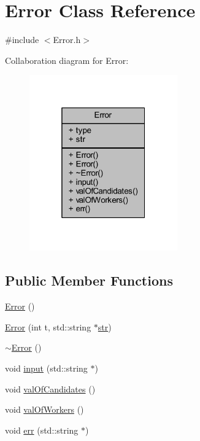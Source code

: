 \hypertarget{class_error}{}\section{Error Class Reference}
\label{class_error}


{\ttfamily \#include $<$Error.\+h$>$}



Collaboration diagram for Error\+:
\nopagebreak
\begin{figure}[H]
\begin{center}
\leavevmode
\includegraphics[width=181pt]{class_error__coll__graph}
\end{center}
\end{figure}
\subsection*{Public Member Functions}
\begin{DoxyCompactItemize}
\item 
\hyperlink{class_error_aca339d00ad8481fb4c184f0ece42698b}{Error} ()
\item 
\hyperlink{class_error_a9e6a79d4d774de29af7a7ea7fe3f8c7b}{Error} (int t, std\+::string $\ast$\hyperlink{class_error_adef2e029304986e6210e7f81f0dca074}{str})
\item 
\hyperlink{class_error_a1a45d42a3a035d510333cdfeb36a0e93}{$\sim$\+Error} ()
\item 
void \hyperlink{class_error_a9f20c7656a23e4f4cf1fa600ced37421}{input} (std\+::string $\ast$)
\item 
void \hyperlink{class_error_a35ab6ad1cad16467c4817cdc8e3ebaea}{val\+Of\+Candidates} ()
\item 
void \hyperlink{class_error_a5d7c6b97cda36f85a426dd2032c242d3}{val\+Of\+Workers} ()
\item 
void \hyperlink{class_error_a047207c59d0f2bedd19256e011abb80e}{err} (std\+::string $\ast$)
\end{DoxyCompactItemize}
